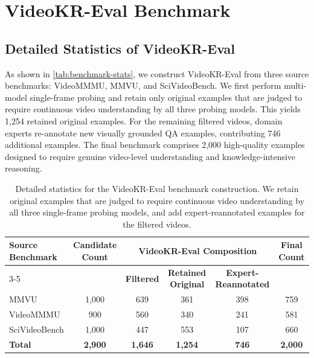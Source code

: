 \documentclass{llmxive}
\providecommand{\eval}{VideoKR-Eval\xspace}
\begin{document}
\section{\eval Benchmark}
\subsection{Detailed Statistics of \eval}
\label{app:benchmark-stat}

As shown in \autoref{tab:benchmark-stats}, we construct \eval from three source benchmarks: VideoMMMU, MMVU, and SciVideoBench. We first perform multi-model single-frame probing and retain only original examples that are judged to require continuous video understanding by all three probing models. This yields 1,254 retained original examples. For the remaining filtered videos, domain experts re-annotate new visually grounded QA examples, contributing 746 additional examples. The final benchmark comprises 2,000 high-quality examples designed to require genuine video-level understanding and knowledge-intensive reasoning.


\begin{table}[h]
    \centering
    \small
    \begin{tabular}{lccccc}
        \toprule
        \multirow{2}{*}{\textbf{Source Benchmark}} & \multirow{2}{*}{\textbf{Candidate Count}} & \multicolumn{3}{c}{\textbf{VideoKR-Eval Composition}} & \multirow{2}{*}{\textbf{Final Count}} \\
        \cmidrule(lr){3-5}
         & & \textbf{Filtered} & \textbf{Retained Original} & \textbf{Expert-Reannotated} & \\
        \midrule
        MMVU & 1,000 & 639 & 361 & 398 & 759 \\
        VideoMMMU & 900 & 560 & 340 & 241 & 581 \\
        SciVideoBench & 1,000 & 447 & 553 & 107 & 660 \\
        \midrule
        \textbf{Total} & \textbf{2,900} & \textbf{1,646} & \textbf{1,254} & \textbf{746} & \textbf{2,000} \\
        \bottomrule
    \end{tabular}
\caption{Detailed statistics for the VideoKR-Eval benchmark construction. We retain original examples that are judged to require continuous video understanding by all three single-frame probing models, and add expert-reannotated examples for the filtered videos.}
\label{tab:benchmark-stats}
\end{table}
\end{document}
